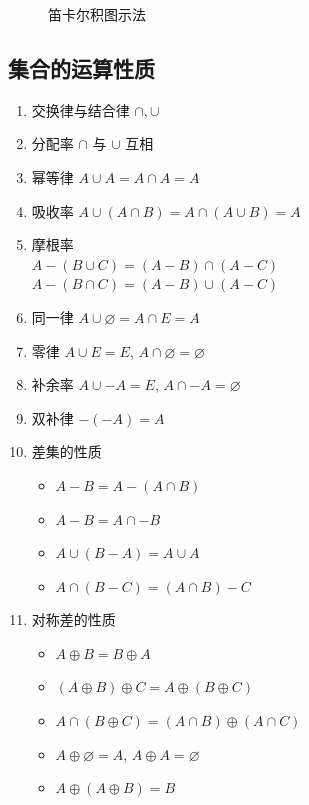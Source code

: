 \documentclass[11pt,a4paper,twocolumn,fleqn]{article} %
\renewcommand{\emptyset}{\varnothing}
\begin{document}
\begin{enumerate}
\begin{figure}[!htp]
	 \caption{笛卡尔积图示法}
	\end{figure}
\end{enumerate}
\subsection{集合的运算性质} %
\label{sub:set_calculation}
\begin{enumerate}
	\item 交换律与结合律 $\cap, \cup$
	\item 分配率 $\cap$ 与 $\cup$ 互相
	\item 幂等律 $A\cup A = A \cap A = A$
	\item 吸收率 $A\cup(A\cap B) = A\cap (A\cup B) = A$
	\item 摩根率\\
	$A - (B\cup C) = (A-B)\cap (A-C)$\\
	$A - (B\cap C) = (A-B)\cup (A-C)$
	\item 同一律 $A\cup\emptyset = A\cap E = A$
	\item 零律 $A\cup E = E$, $A\cap\emptyset = \emptyset$
	\item 补余率 $A\cup -A = E$, $A\cap -A = \emptyset$
	\item 双补律 $-(-A) = A$
	\item 差集的性质
	\begin{itemize}
		\item $A-B = A-(A\cap B)$
		\item $A-B = A\cap -B$
		\item $A\cup (B-A) = A\cup A$
		\item $A\cap (B-C) = (A\cap B) - C$
	\end{itemize}
	\item 对称差的性质
	\begin{itemize}
		\item $A\oplus B = B\oplus A$
		\item $(A\oplus B)\oplus C = A\oplus (B\oplus C)$
		\item $A\cap(B\oplus C) = (A\cap B)\oplus (A\cap C)$
		\item $A\oplus \emptyset = A$, $A\oplus A = \emptyset$
		\item $A\oplus(A\oplus B) = B$
	\end{itemize}
\end{enumerate}
\end{document}
